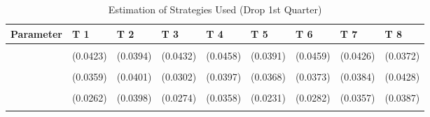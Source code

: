 \begin{table}[!h]
\centering
\caption{Estimation of Strategies Used (Drop 1st Quarter)}
\centering
\begin{tabular}[t]{lllllllll}
\toprule
Parameter & T 1 & T 2 & T 3 & T 4 & T 5 & T 6 & T 7 & T 8\\
\midrule
\cellcolor{gray!10}{gamma} & \cellcolor{gray!10}{0.7234***} & \cellcolor{gray!10}{0.6496***} & \cellcolor{gray!10}{0.6883***} & \cellcolor{gray!10}{0.7173***} & \cellcolor{gray!10}{0.6595***} & \cellcolor{gray!10}{0.7500***} & \cellcolor{gray!10}{0.7204***} & \cellcolor{gray!10}{0.7480***}\\
 & (0.0423) & (0.0394) & (0.0432) & (0.0458) & (0.0391) & (0.0459) & (0.0426) & (0.0372)\\
\cellcolor{gray!10}{AD} & \cellcolor{gray!10}{0.4505***} & \cellcolor{gray!10}{0.3363***} & \cellcolor{gray!10}{0.7947***} & \cellcolor{gray!10}{0.6678***} & \cellcolor{gray!10}{0.7479***} & \cellcolor{gray!10}{0.7256***} & \cellcolor{gray!10}{0.3378***} & \cellcolor{gray!10}{0.3278***}\\
 & (0.0359) & (0.0401) & (0.0302) & (0.0397) & (0.0368) & (0.0373) & (0.0384) & (0.0428)\\
\cellcolor{gray!10}{AC} & \cellcolor{gray!10}{0.0291} & \cellcolor{gray!10}{0.1774***} & \cellcolor{gray!10}{0.1308***} & \cellcolor{gray!10}{0.1504***} & \cellcolor{gray!10}{0.1067***} & \cellcolor{gray!10}{0.1112***} & \cellcolor{gray!10}{0.2118***} & \cellcolor{gray!10}{0.1933***}\\
\addlinespace
 & (0.0262) & (0.0398) & (0.0274) & (0.0358) & (0.0231) & (0.0282) & (0.0357) & (0.0387)\\
\cellcolor{gray!10}{G} & \cellcolor{gray!10}{0.5204***} & \cellcolor{gray!10}{0.4863***} & \cellcolor{gray!10}{0.0746**} & \cellcolor{gray!10}{0.1818***} & \cellcolor{gray!10}{0.1454***} & \cellcolor{gray!10}{0.1632***} & \cellcolor{gray!10}{0.4504***} & \cellcolor{gray!10}{0.4789***}\\
\bottomrule
\end{tabular}
\end{table}